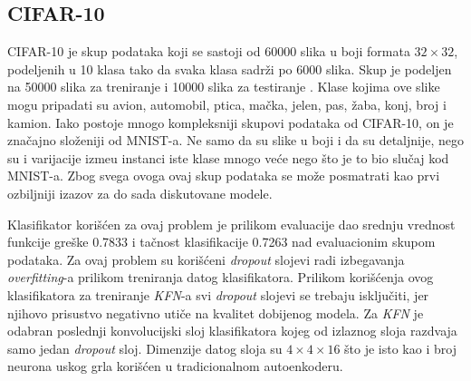 \documentclass{article}
\begin{document}
	\subsection{CIFAR-10}
	\label{cifar10-section}
	
	CIFAR-10 je skup podataka koji se sastoji od 60000 slika u boji formata $32 \times 32$, podeljenih u 10 klasa tako da svaka klasa sadr\v zi po 6000 slika. 
	Skup je podeljen na 50000 slika za treniranje i 10000 slika za testiranje \cite{cifar10}. 
	Klase kojima ove slike mogu pripadati su avion, automobil, ptica, ma\v cka, jelen, pas, \v zaba, konj, broj i kamion.
	Iako postoje mnogo kompleksniji skupovi podataka od CIFAR-10, on je zna\v cajno slo\v zeniji od MNIST-a.
	Ne samo da su slike u boji i da su detaljnije, nego su i varijacije izme\dj u instanci iste klase mnogo ve\'ce nego \v sto je to bio slu\v caj kod MNIST-a.
	Zbog svega ovoga ovaj skup podataka se mo\v ze posmatrati kao prvi ozbiljniji izazov za do sada diskutovane modele.
	
	Klasifikator kori\v s\'cen za ovaj problem je prilikom evaluacije dao srednju vrednost funkcije gre\v ske 0.7833 i ta\v cnost klasifikacije 0.7263 nad evaluacionim skupom podataka.
	Za ovaj problem su kori\v s\'ceni \emph{dropout} slojevi radi izbegavanja \emph{overfitting}-a prilikom treniranja datog klasifikatora.
	Prilikom kori\v s\'cenja ovog klasifikatora za treniranje \emph{KFN}-a svi \emph{dropout} slojevi se trebaju isklju\v citi, jer njihovo prisustvo negativno uti\v ce na kvalitet dobijenog modela.
	Za \emph{KFN} je odabran poslednji konvolucijski sloj klasifikatora kojeg od izlaznog sloja razdvaja samo jedan \emph{dropout} sloj.
	Dimenzije datog sloja su $4 \times 4 \times 16$ \v sto je isto kao i broj neurona uskog grla kori\v s\'cen u tradicionalnom autoenkoderu.
	
\end{document}
